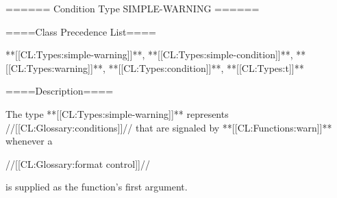 ====== Condition Type SIMPLE-WARNING ======

====Class Precedence List====

**[[CL:Types:simple-warning]]**, **[[CL:Types:simple-condition]]**, **[[CL:Types:warning]]**, **[[CL:Types:condition]]**, **[[CL:Types:t]]**

====Description====

The type **[[CL:Types:simple-warning]]** represents //[[CL:Glossary:conditions]]// that are signaled by **[[CL:Functions:warn]]** whenever a

//[[CL:Glossary:format control]]//

is supplied as the function's first argument.

 
